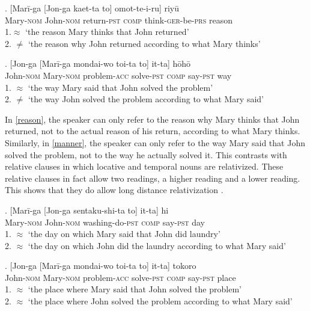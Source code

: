 \documentclass [output=book,colorlinks,citecolor=brown]{langscibook}
\begin{document}
\exg. [Marī-ga [Jon-ga kaet-ta to] omot-te-i-ru] riyū \label{reason}\\
Mary-\textsc{nom} John-\textsc{nom} return-\textsc{pst} \textsc{comp} think-\textsc{ger}-be-\textsc{prs} reason\\
1.$\approx$ `the reason Mary thinks that John returned’\\
2. $\neq$ `the reason why John returned according to what Mary thinks' \\ \null \hfill \citep[185]{murasugi:1991:noun}

\newpage

\exg. [Jon-ga [Marī-ga mondai-wo toi-ta to] it-ta] hōhō \label{manner}\\
John-\textsc{nom} Mary-\textsc{nom} problem-\textsc{acc} solve-\textsc{pst} \textsc{comp} say-\textsc{pst} way\\
1. $\approx$ `the way Mary said that John solved the problem’\\
2. $\neq$ `the way John solved the problem according to what Mary said’ \\ \null \hfill \citep[133]{murasugi:1991:noun}

In \ref{reason}, the speaker can only refer to the reason why Mary thinks that John returned, not to the actual reason of his return, according to what Mary thinks. Similarly, in \ref{manner}, the speaker can only refer to the way Mary said that John solved the problem, not to the way he actually solved it. This contrasts with relative clauses in which locative and temporal nouns are relativized. These relative clauses in fact allow two readings, a higher reading and a lower reading. This shows that they do allow long distance relativization \citep[133–134]{murasugi:1991:noun}. %

\exg. [Marī-ga [Jon-ga sentaku-shi-ta to] it-ta] hi \label{hi}\\
Mary-\textsc{nom} John-\textsc{nom} washing-do-\textsc{pst} \textsc{comp} say-\textsc{pst} day\\
1. $\approx$ `the day on which Mary said that John did laundry’\\
2. $\approx$ `the day on which John did the laundry according to what Mary said’ \\ \null \hfill \citep[134]{murasugi:1991:noun}

\exg. [Jon-ga [Marī-ga mondai-wo toi-ta to] it-ta] tokoro\\
John-\textsc{nom} Mary-\textsc{nom} problem-\textsc{acc} solve-\textsc{pst} \textsc{comp} say-\textsc{pst} place\\
1. $\approx$ `the place where Mary said that John solved the problem’\\
2. $\approx$ `the place where John solved the problem according to what Mary said’ \\ \null \hfill \citep[134]{murasugi:1991:noun}
\end{document}

